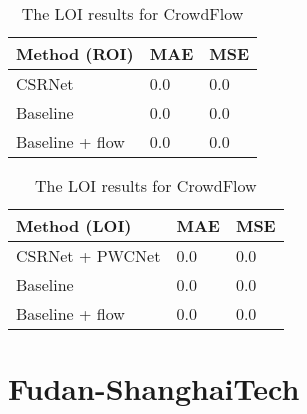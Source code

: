 \begin{table}[!htb]
    \begin{minipage}{.5\linewidth}
      \centering
		\begin{tabular}{lll}
		\hline
		Method (ROI)                               & MAE & MSE \\ \hline
		\multicolumn{1}{l|}{CSRNet}          & 0.0 & 0.0 \\
		\multicolumn{1}{l|}{Baseline}        & 0.0 & 0.0 \\
		\multicolumn{1}{l|}{Baseline + flow} & 0.0 & 0.0 \\ \hline
		\end{tabular}
		\caption{\label{tab:roi_crowdflow}The ROI results for CrowdFlow}
	\end{minipage}
	\begin{minipage}{.5\linewidth}
      \centering
		\begin{tabular}{lll}
		\hline
		Method (LOI)                               & MAE & MSE \\ \hline
		\multicolumn{1}{l|}{CSRNet + PWCNet}          & 0.0 & 0.0 \\
		\multicolumn{1}{l|}{Baseline}        & 0.0 & 0.0 \\
		\multicolumn{1}{l|}{Baseline + flow} & 0.0 & 0.0 \\ \hline
		\end{tabular}
		\caption{\label{tab:loi_crowdflow}The LOI results for CrowdFlow}
	\end{minipage}
\end{table}

\section{Fudan-ShanghaiTech}

